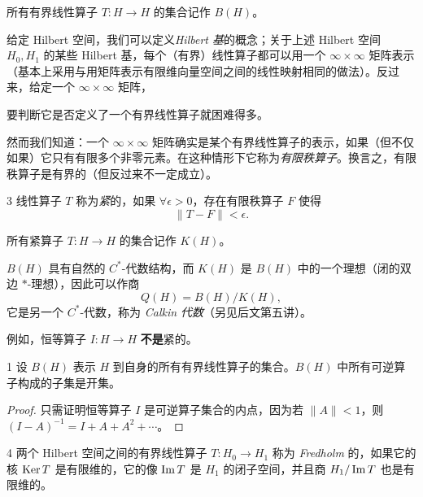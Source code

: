 所有有界线性算子 $T:H\to H$ 的集合记作 $B(H)$。

给定 Hilbert 空间，我们可以定义\emph{Hilbert 基}的概念；关于上述 Hilbert 空间 $H_0,H_1$ 的某些 Hilbert 基，每个（有界）线性算子都可以用一个 $\infty\times\infty$ 矩阵表示（基本上采用与用矩阵表示有限维向量空间之间的线性映射相同的做法）。反过来，给定一个 $\infty\times\infty$ 矩阵，


要判断它是否定义了一个有界线性算子就困难得多。

然而我们知道：一个 $\infty\times\infty$ 矩阵确实是某个有界线性算子的表示，如果（但不仅如果）它只有有限多个非零元素。在这种情形下它称为\emph{有限秩算子}。换言之，有限秩算子是有界的（但反过来不一定成立）。

\begin{defn}{3} 线性算子 $T$ 称为\emph{紧}的，如果 $\forall\epsilon>0$，存在有限秩算子 $F$ 使得
\[ \|T-F\|<\epsilon. \]
\end{defn}

所有紧算子 $T:H\to H$ 的集合记作 $K(H)$。

$B(H)$ 具有自然的 $C^*$-代数结构，而 $K(H)$ 是 $B(H)$ 中的一个理想（闭的双边 $*$-理想），因此可以作商
\[ Q(H)=B(H)/K(H), \]
它是另一个 $C^*$-代数，称为 \emph{Calkin 代数}（另见后文第五讲）。

例如，恒等算子 $I:H\to H$ \textbf{不是}紧的。

\begin{prop}{1} 设 $B(H)$ 表示 $H$ 到自身的所有有界线性算子的集合。$B(H)$ 中所有可逆算子构成的子集是开集。 \end{prop}

\begin{proof}
只需证明恒等算子 $I$ 是可逆算子集合的内点，因为若 $\|A\|<1$，则 $(I-A)^{-1}=I+A+A^2+\cdots$。
\end{proof}

\begin{defn}{4} 两个 Hilbert 空间之间的有界线性算子 $T:H_0\to H_1$ 称为 \emph{Fredholm} 的，如果它的核 $\operatorname{Ker} T$ 是有限维的，它的像 $\operatorname{Im} T$ 是 $H_1$ 的闭子空间，并且商 $H_1/\operatorname{Im} T$ 也是有限维的。 \end{defn}


